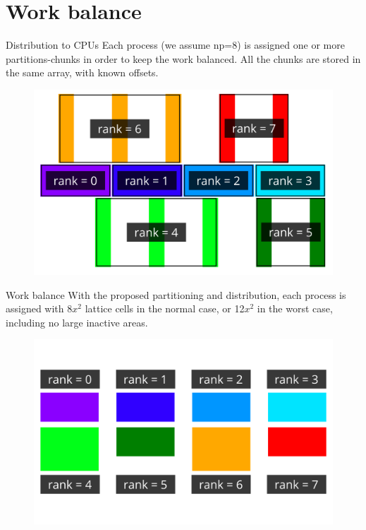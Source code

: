 \documentclass[9pt,pdftex]{beamer}
\begin{document}
\section{Work balance}
\begin{frame}{Distribution to CPUs}
 Each process (we assume np=8) is assigned one or more partitions-chunks in order to
 keep the work balanced. All the chunks are stored in the same array, with known offsets. 
 \begin{figure}
  \includegraphics[width=0.8\linewidth]{cpus_divided}
 \end{figure}

\end{frame}

\begin{frame}{Work balance}
 With the proposed partitioning and distribution, each process is assigned
 with 8$x^2$ lattice cells in the normal case, or 12$x^2$ in the worst case,
 including no large inactive areas.
 \begin{figure}
  \includegraphics[width=0.8\linewidth]{load_balance}
 \end{figure} 
\end{frame}
\end{document}
